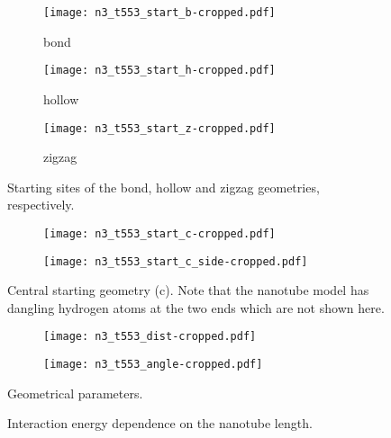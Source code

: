 \def\bfig#1#2{\expandafter\gdef\csname fig-#1\endcsname{\begin{figure}[ht]#2\label{#1}\end{figure}}}
\def\fref#1{\csname fig-#1\endcsname\Cref{#1}}

\bfig{fig:n3t553_start_sites}{
    \centering
    \begin{subfigure}{3cm}
        \texttt{[image: n3\_t553\_start\_b-cropped.pdf]}
        \caption{bond}
    \end{subfigure}
    \hspace{1cm}
    \begin{subfigure}{3cm}
        \texttt{[image: n3\_t553\_start\_h-cropped.pdf]}
        \caption{hollow}
    \end{subfigure}
    \hspace{1cm}
    \begin{subfigure}{3cm}
        \texttt{[image: n3\_t553\_start\_z-cropped.pdf]}
        \caption{zigzag}
    \end{subfigure}
    \caption{Starting sites of the bond, hollow and zigzag geometries, respectively.}
}

\bfig{fig:n3t553_start_center}{
    \centering
    \begin{subfigure}{3cm}
        \texttt{[image: n3\_t553\_start\_c-cropped.pdf]}
    \end{subfigure}
    \hspace{1cm}
    \begin{subfigure}{3cm}
        \texttt{[image: n3\_t553\_start\_c\_side-cropped.pdf]}
    \end{subfigure}
    \caption{Central starting geometry (c). Note that the nanotube model has dangling hydrogen atoms at the two ends which are not shown here.}
}

\bfig{fig:n3t553_geom_parms}{
    \centering
    \begin{subfigure}{4.7cm}
        \texttt{[image: n3\_t553\_dist-cropped.pdf]}
    \end{subfigure}
    \hspace{1cm}
    \begin{subfigure}{4cm}
        \texttt{[image: n3\_t553\_angle-cropped.pdf]}
    \end{subfigure}
    \caption{Geometrical parameters.}
}

\bfig{fig:n3t55x_eint}{
    \centering
    
    \caption{Interaction energy dependence on the nanotube length.}
}
